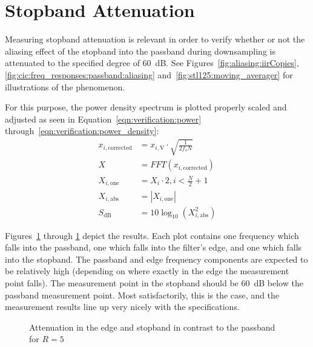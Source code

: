 \section{Stopband Attenuation} %
\label{sec:verification:snr}

Measuring stopband attenuation  is relevant in order to verify  whether or not
the aliasing effect  of the stopband into the passband  during downsampling is
attenuated to the specified degree of \SI{60}{\dB}. See
Figures~\ref{fig:aliasing:iirCopies},
\ref{fig:cic:freq_responses:passband:aliasing}
and~\ref{fig:stl125:moving_averager} for illustrations of the phenomenon.

For this purpose,  the power density spectrum is plotted
properly scaled and adjusted  as seen in Equation~\ref{eqn:verification:power}
through~\ref{eqn:verification:power_density}:
\begin{align}
    x_{i,\mathrm{corrected}} &= x_{i,\mathrm{V}} \cdot \sqrt{\frac{1}{2f_s N}} \label{eqn:verification:power} \\
    X                        &= FFT\left(x_{i,\mathrm{corrected}}\right)       \\
    X_{i,\mathrm{one}}       &= X_i \cdot 2, i < \frac{N}{2}+1                 \\
    X_{i,\mathrm{abs}}       &= |X_{i,\mathrm{one}}|                           \\
    S_{\si{\dB}}             &= 10\log_{10}(X_{i,\mathrm{abs}}^2)              \label{eqn:verification:power_density}
\end{align}

Figures~\ref{fig:verification:fB5}  through \ref{fig:verification:fB5}  depict
the results. Each plot  contains one frequency which falls  into the passband,
one which falls into the filter's edge, and one which falls into the stopband.
The passband and edge frequency components  are expected to be relatively high
(depending  on where  exactly in  the edge  the measurement  point falls). The
measurement point  in the stopband  should be \SI{60}{\dB} below  the passband
measurement point. Most satisfactorily, this is  the case, and the measurement
results line up very nicely with the specifications.

\begin{figure}
    \centering
    
    \caption[Attenuation in the Edge and Stopband in Contrast to the Passband for R=5]{%
        Attenuation in the edge and stopband in contrast to the passband for $R=5$%
    }
    \label{fig:verification:fB5}
\end{figure}

